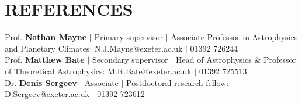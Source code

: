 \documentclass[letterpaper,11pt]{article}
\begin{document}
\section{REFERENCES}
 \begin{itemize}[leftmargin=0in, label={}]
    \small{\item{
     Prof. \textbf{Nathan Mayne}{ $|$ Primary supervisor $|$ Associate Professor in Astrophysics and Planetary Climates:} {N.J.Mayne@exeter.ac.uk $|$ 01392 726244}\vspace{2pt} \\
     Prof. \textbf{Matthew Bate}{ $|$ Secondary supervisor $|$ Head of Astrophysics \& Professor of Theoretical Astrophysics:} {M.R.Bate@exeter.ac.uk $|$ 01392 725513}\vspace{2pt} \\
     Dr. \textbf{Denis Sergeev}{ $|$ Associate $|$ Postdoctoral research fellow:}
     \\
     {D.Sergeev@exeter.ac.uk $|$ 01392 723612}\vspace{2pt} \\

    }}
 \end{itemize}
\end{document}
